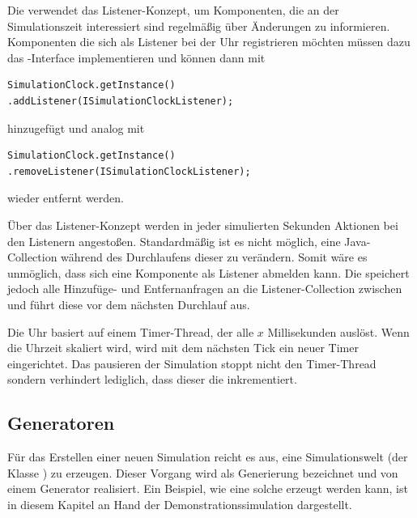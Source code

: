 Die  verwendet das Listener-Konzept, um Komponenten, die an der Simulationszeit interessiert sind regelmäßig über Änderungen zu informieren. Komponenten die sich als Listener bei der Uhr registrieren möchten müssen dazu das -Interface implementieren und können dann mit 
\begin{illfloat}[H]
  \begin{lstlisting}
SimulationClock.getInstance()
.addListener(ISimulationClockListener);
  \end{lstlisting}
\end{illfloat}

hinzugefügt und analog mit
\begin{illfloat}[H]
\begin{lstlisting}
SimulationClock.getInstance()
.removeListener(ISimulationClockListener);
\end{lstlisting}
\end{illfloat}
wieder entfernt werden.

Über das Listener-Konzept werden in jeder simulierten Sekunden Aktionen bei den Listenern angestoßen. Standardmäßig ist es nicht möglich, eine Java-Collection während des Durchlaufens dieser zu verändern. Somit wäre es unmöglich, dass sich eine Komponente als Listener abmelden kann. Die  speichert jedoch alle Hinzufüge- und Entfernanfragen an die Listener-Collection zwischen und führt diese vor dem nächsten Durchlauf aus.

Die Uhr basiert auf einem Timer-Thread, der alle $x$ Millisekunden auslöst. Wenn die Uhrzeit skaliert wird, wird mit dem nächsten Tick ein neuer Timer eingerichtet. Das pausieren der Simulation stoppt nicht den Timer-Thread sondern verhindert lediglich, dass dieser die  inkrementiert.


\subsection{Generatoren}\label{subsec:real_generator}
Für das Erstellen einer neuen Simulation reicht es aus, eine Simulationswelt (der Klasse ) zu erzeugen. Dieser Vorgang wird als Generierung bezeichnet und von einem Generator realisiert.
Ein Beispiel, wie eine solche erzeugt werden kann, ist in diesem Kapitel an Hand der Demonstrationssimulation dargestellt.\\ 

